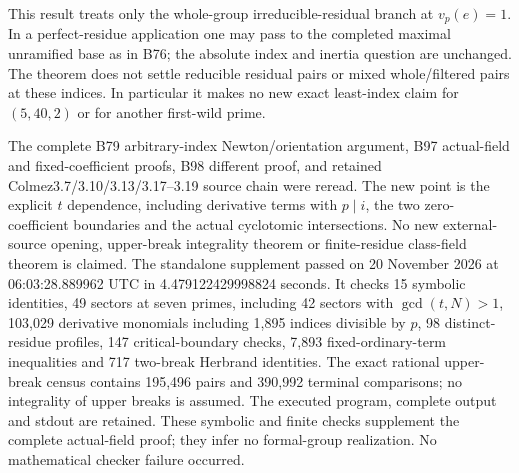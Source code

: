 \begin{remark}
\label{rem:B-RD99-scope}
This result treats only the whole-group irreducible-residual
branch at $v_p(e)=1$. In a perfect-residue application one may
pass to the completed maximal unramified base as in B76; the
absolute index and inertia question are unchanged. The theorem
does not settle reducible residual pairs or mixed whole/filtered
pairs at these indices. In particular it makes no new exact
least-index claim for $(5,40,2)$ or for another first-wild prime.

The complete B79 arbitrary-index Newton/orientation argument,
B97 actual-field and fixed-coefficient proofs, B98 different
proof, and retained Colmez3.7/3.10/3.13/3.17--3.19 source chain
were reread. The new point is the explicit $t$ dependence,
including derivative terms with $p\mid i$, the two zero-coefficient
boundaries and the actual cyclotomic intersections. No new
external-source opening, upper-break integrality theorem or
finite-residue class-field theorem is claimed. The standalone
supplement
passed on 20 November 2026 at 06:03:28.889962 UTC in
4.479122429998824 seconds. It checks 15 symbolic identities,
49 sectors at seven primes, including 42 sectors with
$\gcd(t,N)>1$, 103,029 derivative monomials including 1,895
indices divisible by $p$, 98 distinct-residue profiles,
147 critical-boundary checks, 7,893 fixed-ordinary-term
inequalities and 717 two-break Herbrand identities.
The exact rational upper-break census contains 195,496 pairs
and 390,992 terminal comparisons; no integrality of upper
breaks is assumed. The executed program, complete output and
stdout are retained. These symbolic and finite checks supplement
the complete actual-field proof; they infer no formal-group
realization. No mathematical checker failure occurred.
\end{remark}
